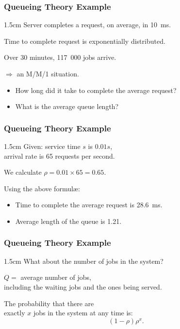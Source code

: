 \begin{frame}
\frametitle{Queueing Theory Example}

\large
\begin{changemargin}{1.5cm}
Server completes a request, on average, in 10~ms. 

Time to complete request is exponentially distributed. 

Over 30 minutes, 117~000 jobs arrive. 

$\Longrightarrow$ an M/M/1 situation. 

\begin{itemize}
\item How long did it take to complete the average request? 

\item What is the average queue length?
\end{itemize}
\end{changemargin}

\end{frame}



\begin{frame}
\frametitle{Queueing Theory Example}

\large
\begin{changemargin}{1.5cm}
Given: service time $s$ is $0.01s$, \\
arrival rate is 65 requests per second. 

We calculate $\rho = 0.01 \times 65 = 0.65$. 

Using the above formul\ae:

\begin{itemize}
\item Time to complete the average request is 28.6~ms. 

\item Average length of the queue is 1.21.
\end{itemize}
\end{changemargin}
\end{frame}



\begin{frame}
\frametitle{Queueing Theory Example}

\large
\begin{changemargin}{1.5cm}
What about the number of jobs in the system? 

$Q = $ average number of jobs, \\
including the waiting jobs and the ones being served.  

The probability that there are\\
 exactly $x$ jobs in the system at any time is: 
\[ (1-\rho)\rho^{x}.\]
\end{changemargin}

\end{frame}



